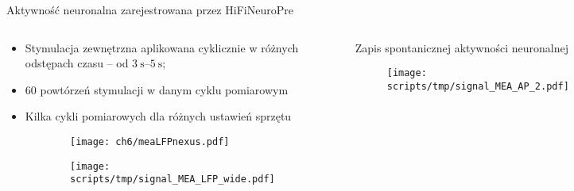 \begin{frame}{Aktywność neuronalna zarejestrowana przez HiFiNeuroPre}
    \begin{columns}

        \vspace{-1em}

        \begin{block}{}
            {\renewcommand\normalsize{\small}%
            \normalsize
            \begin{itemize}
                \item Stymulacja zewnętrzna  aplikowana cyklicznie w różnych odstępach czasu -- od $\SIrange{3}{5}{\second}$;
                \item 60 powtórzeń stymulacji w danym cyklu pomiarowym 
                \item Kilka cykli pomiarowych dla różnych ustawień sprzętu
    
            \end{itemize}
            }
            \vspace{-1em}
        \begin{figure}[H]
        
        
            \begin{subfigure}{0.25\textwidth}
                \texttt{[image: ch6/meaLFPnexus.pdf]}
             \end{subfigure}
                \hspace{-2em}
             \begin{subfigure}{0.7\textwidth}
                \texttt{[image: scripts/tmp/signal\_MEA\_LFP\_wide.pdf]}
             \end{subfigure}
        \end{figure}
        \end{block}
        \vspace{-1em}

        \begin{block}{Zapis spontanicznej aktywności neuronalnej}
            \begin{figure}[H]
                \centering
                \texttt{[image: scripts/tmp/signal\_MEA\_AP\_2.pdf]}
        \end{figure}
        \end{block}


\end{columns}
\end{frame}
